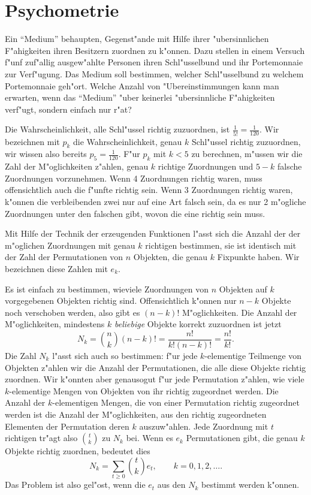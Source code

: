 \section{Psychometrie}
Ein ``Medium'' behaupten, Gegenst"ande mit Hilfe ihrer "ubersinnlichen F"ahigkeiten
ihren Besitzern zuordnen zu k"onnen. Dazu stellen in einem Versuch f"unf
zuf"allig ausgew"ahlte Personen ihren Schl"usselbund und ihr Portemonnaie zur
Ver\-f"ugung. Das Medium soll bestimmen, welcher Schl"usselbund zu welchem
Portemonnaie geh"ort.
Welche Anzahl von "Ubereinstimmungen kann man erwarten, wenn das ``Medium''
"uber keinerlei "ubersinnliche F"ahigkeiten verf"ugt, sondern einfach nur r"at?

Die Wahrscheinlichkeit, alle Schl"ussel richtig zuzuordnen, ist $\frac1{5!}=\frac1{120}$.
Wir bezeichnen mit $p_k$ die Wahrscheinlichkeit, genau $k$ Schl"ussel richtig zuzuordnen,
wir wissen also bereits $p_5=\frac1{120}$. F"ur $p_k$ mit $k<5$ zu berechnen, 
m"ussen wir die Zahl der M"oglichkeiten z"ahlen, genau $k$ richtige Zuordnungen
und $5-k$ falsche Zuordnungen vorzunehmen. Wenn 4 Zuordnungen richtig waren,
muss offensichtlich auch die f"unfte richtig sein. Wenn 3 Zuordnungen richtig waren,
k"onnen die verbleibenden zwei nur auf eine Art falsch sein, da es nur 2 m"ogliche
Zuordnungen unter den falschen gibt, wovon die eine richtig sein muss.

Mit Hilfe der Technik der erzeugenden Funktionen l"asst sich die Anzahl der
der m"oglichen Zuordnungen mit genau $k$ richtigen bestimmen, sie ist identisch
mit der Zahl der Permutationen von $n$ Objekten, die genau $k$ Fixpunkte haben.
Wir bezeichnen diese Zahlen mit $e_k$.

Es ist einfach zu bestimmen, wieviele Zuordnungen von $n$ Objekten auf $k$
vorgegebenen Objekten richtig sind. Offensichtlich k"onnen nur $n-k$ Objekte
noch verschoben werden, also gibt es $(n-k)!$ M"oglichkeiten.
Die Anzahl der M"oglichkeiten, mindestens $k$ {\it beliebige} Objekte korrekt
zuzuordnen ist jetzt
$$N_k=\binom{n}{k}(n-k)!=\frac{n!}{k!(n-k)!}=\frac{n!}{k!}.$$
Die Zahl $N_k$ l"asst sich auch so bestimmen: f"ur jede $k$-elementige
Teilmenge von Objekten z"ahlen wir die Anzahl der Permutationen, die 
alle diese Objekte richtig zuordnen. Wir k"onnten aber genausogut
f"ur jede Permutation z"ahlen, wie viele $k$-elementige Mengen von Objekten
von ihr richtig zugeordnet werden. Die Anzahl der $k$-elementigen Mengen,
die von einer Permutation richtig zugeordnet werden ist die Anzahl der
M"oglichkeiten, aus den richtig zugeordneten Elementen der Permutation
deren $k$ auszuw"ahlen. Jede Zuordnung mit $t$ richtigen tr"agt also
$\binom{t}{k}$ zu $N_k$ bei. Wenn es $e_k$ Permutationen gibt,
die genau $k$ Objekte richtig zuordnen, bedeutet dies
$$N_k=\sum_{t\ge 0}\binom{t}{k}e_t,\qquad k=0,1,2,\dots.$$
Das Problem ist also gel"ost, wenn die $e_t$ aus den $N_k$ bestimmt werden k"onnen.

